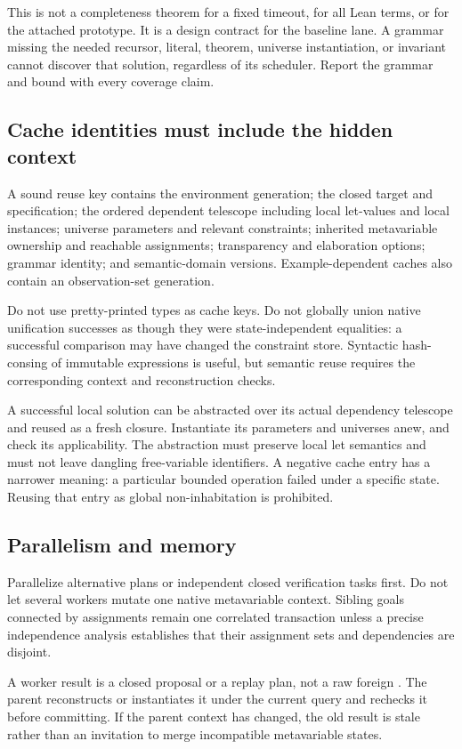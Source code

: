 This is not a completeness theorem for a fixed timeout, for all Lean terms, or for the attached prototype. It is a design contract for the baseline lane. A grammar missing the needed recursor, literal, theorem, universe instantiation, or invariant cannot discover that solution, regardless of its scheduler. Report the grammar and bound with every coverage claim.

\subsection{Cache identities must include the hidden context}
A sound reuse key contains the environment generation; the closed target and specification; the ordered dependent telescope including local let-values and local instances; universe parameters and relevant constraints; inherited metavariable ownership and reachable assignments; transparency and elaboration options; grammar identity; and semantic-domain versions. Example-dependent caches also contain an observation-set generation.

Do not use pretty-printed types as cache keys. Do not globally union native unification successes as though they were state-independent equalities: a successful comparison may have changed the constraint store. Syntactic hash-consing of immutable expressions is useful, but semantic reuse requires the corresponding context and reconstruction checks.

A successful local solution can be abstracted over its actual dependency telescope and reused as a fresh closure. Instantiate its parameters and universes anew, and check its applicability. The abstraction must preserve local let semantics and must not leave dangling free-variable identifiers. A negative cache entry has a narrower meaning: a particular bounded operation failed under a specific state. Reusing that entry as global non-inhabitation is prohibited.

\subsection{Parallelism and memory}
Parallelize alternative plans or independent closed verification tasks first. Do not let several workers mutate one native metavariable context. Sibling goals connected by assignments remain one correlated transaction unless a precise independence analysis establishes that their assignment sets and dependencies are disjoint.

A worker result is a closed proposal or a replay plan, not a raw foreign . The parent reconstructs or instantiates it under the current query and rechecks it before committing. If the parent context has changed, the old result is stale rather than an invitation to merge incompatible metavariable states.

